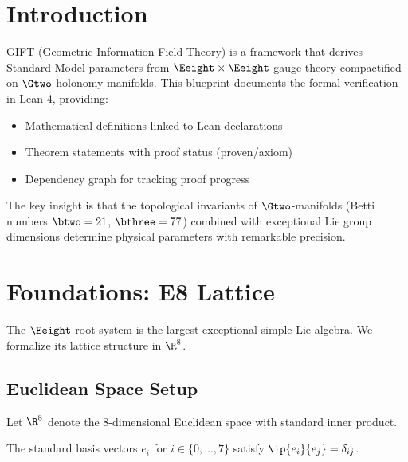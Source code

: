 
\chapter{Introduction}

GIFT (Geometric Information Field Theory) is a framework that derives Standard Model
parameters from $\Eeight \times \Eeight$ gauge theory compactified on $\Gtwo$-holonomy
manifolds. This blueprint documents the formal verification in Lean 4, providing:

\begin{itemize}
    \item Mathematical definitions linked to Lean declarations
    \item Theorem statements with proof status (proven/axiom)
    \item Dependency graph for tracking proof progress
\end{itemize}

The key insight is that the topological invariants of $\Gtwo$-manifolds (Betti numbers
$\btwo = 21$, $\bthree = 77$) combined with exceptional Lie group dimensions determine
physical parameters with remarkable precision.

\chapter{Foundations: E8 Lattice}\label{chap:e8}

The $\Eeight$ root system is the largest exceptional simple Lie algebra.
We formalize its lattice structure in $\R^8$.

\section{Euclidean Space Setup}

\begin{definition}\label{def:R8}
    \leanok
    Let $\R^8$ denote the 8-dimensional Euclidean space with standard inner product.
\end{definition}

\begin{definition}\label{def:stdBasis}
    \leanok
    The standard basis vectors $e_i$ for $i \in \{0, \ldots, 7\}$ satisfy
    $\ip{e_i}{e_j} = \delta_{ij}$.
\end{definition}

